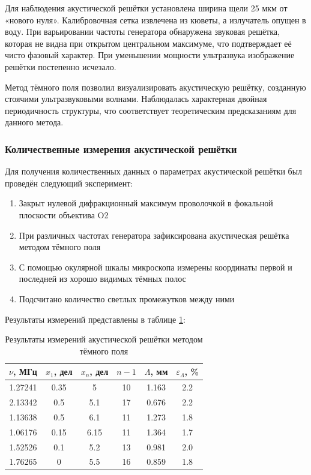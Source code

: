 Для наблюдения акустической решётки установлена ширина щели 25 мкм от «нового нуля». Калибровочная сетка извлечена из кюветы, а излучатель опущен в воду. При варьировании частоты генератора обнаружена звуковая решётка, которая не видна при открытом центральном максимуме, что подтверждает её чисто фазовый характер. При уменьшении мощности ультразвука изображение решётки постепенно исчезало.

Метод тёмного поля позволил визуализировать акустическую решётку, созданную стоячими ультразвуковыми волнами. Наблюдалась характерная двойная периодичность структуры, что соответствует теоретическим предсказаниям для данного метода.

\subsubsection{Количественные измерения акустической решётки}

Для получения количественных данных о параметрах акустической решётки был проведён следующий эксперимент:

\begin{enumerate}
    \item Закрыт нулевой дифракционный максимум проволочкой в фокальной плоскости объектива O2
    \item При различных частотах генератора зафиксирована акустическая решётка методом тёмного поля
    \item С помощью окулярной шкалы микроскопа измерены координаты первой и последней из хорошо видимых тёмных полос
    \item Подсчитано количество светлых промежутков между ними
\end{enumerate}

Результаты измерений представлены в таблице \ref{tab:dark_field}:

\begin{longtable}[c]{|c|c|c|c|c|c|}
\caption{Результаты измерений акустической решётки методом тёмного поля}
\label{tab:dark_field}\\
\hline
$\nu$, МГц & $x_1$, дел & $x_n$, дел & $n-1$ & $\Lambda$, мм & $\varepsilon_\Lambda$, \% \\ \hline
\endfirsthead
%
\endhead
%
1.27241 & 0.35 & 5 & 10 & 1.163 & 2.2 \\ \hline
2.13342 & 0.5 & 5.1 & 17 & 0.676 & 2.2 \\ \hline
1.13638 & 0.5 & 6.1 & 11 & 1.273 & 1.8 \\ \hline
1.06176 & 0.15 & 6.15 & 11 & 1.364 & 1.7 \\ \hline
1.52526 & 0.1 & 5.2 & 13 & 0.981 & 2.0 \\ \hline
1.76265 & 0 & 5.5 & 16 & 0.859 & 1.8 \\ \hline
\end{longtable}

